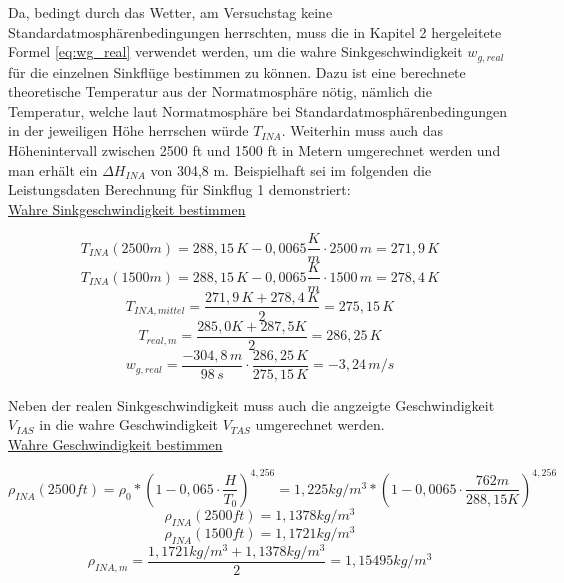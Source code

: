 \noindent Da, bedingt durch das Wetter, am Versuchstag keine Standardatmosphärenbedingungen herrschten, muss die in Kapitel 2 hergeleitete Formel \ref{eq:wg_real} verwendet werden, um die wahre Sinkgeschwindigkeit $w_{g,real}$ für die einzelnen Sinkflüge bestimmen zu können. Dazu ist eine berechnete theoretische Temperatur aus der Normatmosphäre nötig, nämlich die Temperatur, welche laut Normatmosphäre bei Standardatmosphärenbedingungen in der jeweiligen Höhe herrschen würde $T_{INA}$. Weiterhin muss auch das Höhenintervall zwischen 2500 ft und 1500 ft in Metern umgerechnet werden und man erhält ein $\Delta H_{INA}$ von 304,8 m. Beispielhaft sei im folgenden die Leistungsdaten Berechnung für Sinkflug 1 demonstriert:\\

\noindent 
\underline{Wahre Sinkgeschwindigkeit bestimmen}

\begin{equation}
T_{INA}(2500m) = 288,15\,K - 0,0065 \frac{K}{m} \cdot 2500\,m = 271,9\,K
\end{equation}
\begin{equation}
T_{INA}(1500m) = 288,15\,K - 0,0065 \frac{K}{m} \cdot 1500\,m = 278,4\,K
\end{equation}
\begin{equation}
T_{INA,mittel} = \frac{271,9\,K + 278,4\,K}{2} = 275,15\,K
\end{equation}
\begin{equation}
T_{real,m} = \frac{285,0 K + 287,5 K}{2} =	286,25\,K
\end{equation}
\begin{equation}
w_{g,real} = \frac{-304,8\,m}{98\,s} \cdot \frac{286,25\,K}{275,15\,K} = - 3,24\,m/s
\end{equation}

\vspace{5mm}
\noindent Neben der realen Sinkgeschwindigkeit muss auch die angzeigte Geschwindigkeit $V_{IAS}$ in die wahre Geschwindigkeit $V_{TAS}$ umgerechnet werden.\\


\noindent
\underline{Wahre Geschwindigkeit bestimmen}

\begin{equation}
\rho_{INA}(2500ft) = \rho_0 * (1-0,065\cdot \frac{H}{T_0})^{4,256} = 1,225 kg/m^3 * (1-0,0065\cdot \frac{762 m}{288,15 K})^{4,256}
\end{equation}
\begin{equation}
\rho_{INA}(2500ft) = 1,1378 kg/m^3
\end{equation}
\begin{equation}
\rho_{INA}(1500ft) = 1,1721 kg/m^3
\end{equation}
\begin{equation}
\rho_{INA,m} = \frac{1,1721 kg/m^3+1,1378 kg/m^3}{2} = 1,15495 kg/m^3
\end{equation}

